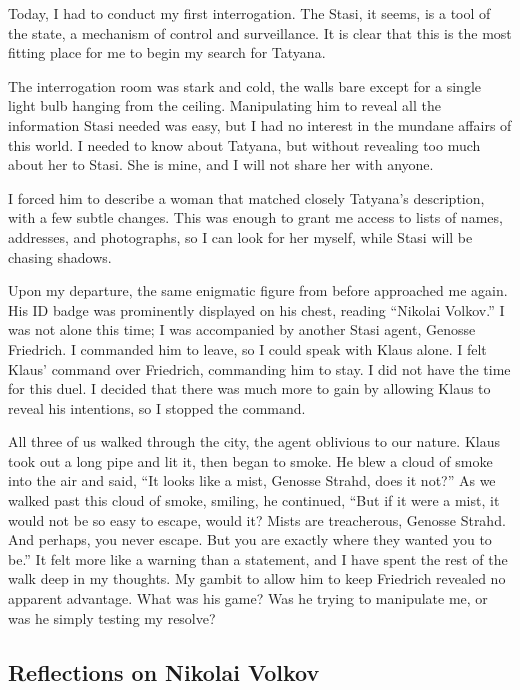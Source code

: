 
Today, I had to conduct my first interrogation.
The Stasi, it seems, is a tool of the state, a mechanism of control and surveillance.
It is clear that this is the most fitting place for me to begin my search for Tatyana.

The interrogation room was stark and cold, the walls bare except for a single light bulb hanging from the ceiling.
Manipulating him to reveal all the information Stasi needed was easy, but I had no interest in the mundane affairs of this world.
I needed to know about Tatyana, but without revealing too much about her to Stasi.
She is mine, and I will not share her with anyone.

I forced him to describe a woman that matched closely Tatyana's description, with a few subtle changes.
This was enough to grant me access to lists of names, addresses, and photographs, so I can look for her myself, while Stasi will be chasing shadows.

Upon my departure, the same enigmatic figure from before approached me again.
His ID badge was prominently displayed on his chest, reading ``Nikolai Volkov.''
I was not alone this time; I was accompanied by another Stasi agent, Genosse Friedrich.
I commanded him to leave, so I could speak with Klaus alone.
I felt Klaus' command over Friedrich, commanding him to stay.
I did not have the time for this duel.
I decided that there was much more to gain by allowing Klaus to reveal his intentions, so I stopped the command.

All three of us walked through the city, the agent oblivious to our nature.
Klaus took out a long pipe and lit it, then began to smoke.
He blew a cloud of smoke into the air and said, ``It looks like a mist, Genosse Strahd, does it not?''
As we walked past this cloud of smoke, smiling, he continued, ``But if it were a mist, it would not be so easy to escape, would it? Mists are treacherous, Genosse Strahd.
And perhaps, you never escape.
But you are exactly where they wanted you to be.''
It felt more like a warning than a statement, and I have spent the rest of the walk deep in my thoughts.
My gambit to allow him to keep Friedrich revealed no apparent advantage.
What was his game? Was he trying to manipulate me, or was he simply testing my resolve?

\subsection*{Reflections on Nikolai Volkov}

